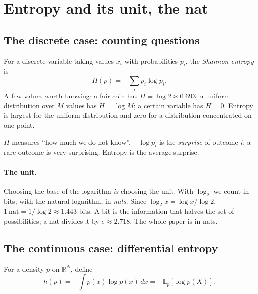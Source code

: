 \documentclass[11pt]{article}
\theoremstyle{plain}
\theoremstyle{definition}
\theoremstyle{remark}
\newcommand{\E}{\mathbb{E}}
\newcommand{\R}{\mathbb{R}}
\begin{document}
\section{Entropy and its unit, the nat}
\label{sec:entropie}

\subsection{The discrete case: counting questions}

For a discrete variable taking values $x_i$ with probabilities $p_i$, the
\emph{Shannon entropy} is
\[
H(p)=-\sum_i p_i\log p_i .
\]
A few values worth knowing: a fair coin has $H=\log 2\approx0.693$; a uniform
distribution over $M$ values has $H=\log M$; a certain variable has $H=0$.
Entropy is largest for the uniform distribution and zero for a distribution
concentrated on one point.

\begin{intuition}
$H$ measures ``how much we do not know''. $-\log p_i$ is the \emph{surprise}
of outcome $i$: a rare outcome is very surprising. Entropy is the average
surprise.
\end{intuition}

\paragraph{The unit.} Choosing the base of the logarithm \emph{is} choosing
the unit. With $\log_2$ we count in bits; with the natural logarithm, in
\emph{nats}. Since $\log_2 x=\log x/\log 2$, $1~\text{nat}=1/\log2\approx1.443$
bits. A bit is the information that halves the set of possibilities; a nat
divides it by $e\approx2.718$. The whole paper is in nats.

\subsection{The continuous case: differential entropy}

For a density $p$ on $\R^N$, define
\[
h(p)=-\int p(x)\log p(x)\,dx = -\E_p[\log p(X)] .
\]
\end{document}
